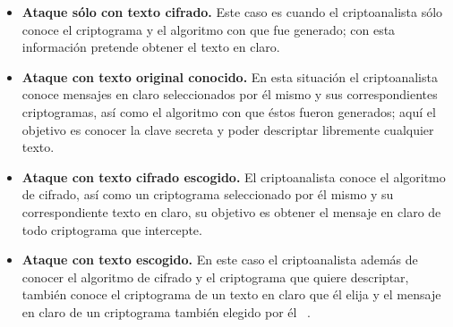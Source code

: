  \begin{itemize} 
	\item \textbf{Ataque sólo con texto cifrado. }
Este caso es cuando el criptoanalista sólo conoce el criptograma y el algoritmo con que fue generado; con esta información pretende obtener el texto en claro.

	\item \textbf{Ataque con texto original conocido. }
En esta situación el criptoanalista conoce mensajes en claro seleccionados por él mismo y sus correspondientes criptogramas, así como el algoritmo con que éstos fueron generados; aquí el objetivo es conocer la clave secreta y poder descriptar libremente cualquier texto.

	\item \textbf{Ataque con texto cifrado escogido. }
El criptoanalista conoce el algoritmo de cifrado, así como un criptograma seleccionado por él mismo y su correspondiente texto en claro, su objetivo es obtener el mensaje en claro de todo criptograma que intercepte.

	\item \textbf{Ataque con texto escogido. }
En este caso el criptoanalista además de conocer el algoritmo de cifrado y el criptograma que quiere descriptar, también conoce el criptograma de un texto en claro que él elija y el mensaje en claro de un criptograma también elegido por él ~\cite{ataques}.
 \end{itemize}




